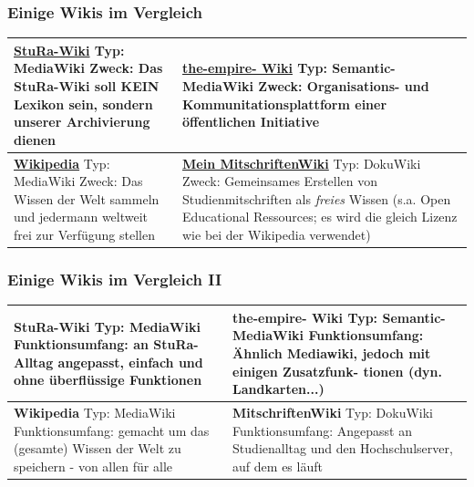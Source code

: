 \documentclass{beamer}              %
\begin{document}
\begin{frame}
  \frametitle{Einige Wikis im Vergleich}
  \begin{table}
    \caption{Wikivergleich1}
    \label{tab:Wikivergleich1}
    \begin{center}
      \begin{longtable}{|l|l|}
        \hline
        \href{http://wiki.stura.htw-dresden.de}{StuRa-Wiki}
        Typ: MediaWiki
        Zweck: Das StuRa-Wiki soll KEIN Lexikon sein, sondern unserer Archivierung dienen &

        \textbf{\href{http://www.the-empire.de}{the-empire- Wiki}}
        Typ: Semantic-MediaWiki
        Zweck: Organisations- und Kommunitationsplattform einer öffentlichen Initiative \\ 
        \hline

        \textbf{\href{http://www.wikipedia.de}{Wikipedia}}
        Typ: MediaWiki
        Zweck: Das Wissen der Welt sammeln und jedermann weltweit frei zur Verfügung stellen &
        \textbf{\href{http://www2.htw-dresden.de/~s70341/cgi-bin/dokuwiki/doku.php}{Mein MitschriftenWiki}}
        Typ: DokuWiki
        Zweck: Gemeinsames Erstellen von Studienmitschriften als \emph{freies} Wissen (s.a.  Open Educational Ressources; es wird die gleich Lizenz wie bei der Wikipedia verwendet) \\ 
        \hline
      \end{longtable}
    \end{center}
  \end{table}

\end{frame}


\begin{frame}
  \frametitle{Einige Wikis im Vergleich II}

  \begin{table}
    \caption{Wikivergleich2}
    \label{tab:Wikivergleich2}

    \begin{center}
      \begin{longtable}{|l|l|}
        \hline
        \textbf{StuRa-Wiki} Typ: MediaWiki Funktionsumfang: an StuRa- Alltag angepasst, einfach und ohne überflüssige Funktionen & \textbf{the-empire- Wiki} Typ: Semantic-MediaWiki Funktionsumfang: Ähnlich Mediawiki, jedoch mit einigen Zusatzfunk- tionen (dyn. Landkarten...) \\ 
        \hline
        \textbf{Wikipedia} Typ: MediaWiki Funktionsumfang: gemacht um das (gesamte) Wissen der Welt zu speichern - von allen für alle & \textbf{MitschriftenWiki} Typ: DokuWiki Funktionsumfang: Angepasst an Studienalltag und den Hochschulserver, auf dem es läuft \\ 
        \hline
      \end{longtable}
    \end{center}
  \end{table}

\end{frame}
\end{document}
